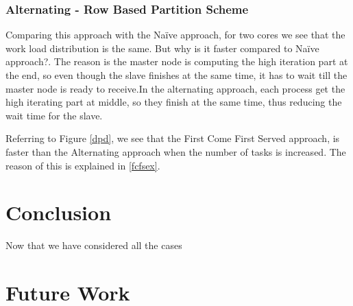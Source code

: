 \documentclass[conference]{IEEEtran}
\begin{document}
	\subsubsection{Alternating - Row Based Partition Scheme}
	
	Comparing this approach with the Naïve approach, for two cores we see that the work load distribution is the same. But why is it faster compared to Naïve approach?. The reason is the master node is computing the high iteration part at the end, so even though the slave finishes at the same time, it has to wait till the master node is ready to receive.In the alternating approach, each process get the high iterating part at middle, so they finish at the same time, thus reducing the wait time for the slave.
	
	Referring to Figure \ref{dpd}, we see that the First Come First Served approach, is faster than the Alternating approach when the number of tasks is increased. The reason of this is explained in \ref{fcfsex}.

	\section{Conclusion}
	Now that we have considered all the cases
	

	\section{Future Work}
	
	

	


\end{document}
